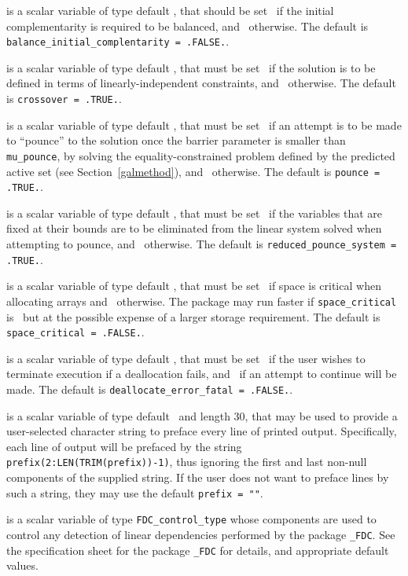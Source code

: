 \begin{description}
 is a scalar variable of type 
default \logical, that should be set \true\
if the initial complementarity is required to be balanced,
and \false\ otherwise.
The default is {\tt balance\_initial\_complentarity = .FALSE.}.

 is a scalar variable of type default \logical,
that must be set \true\ if the solution is to be defined in terms
of linearly-independent constraints,
and  \false\ otherwise.
The default is {\tt crossover = .TRUE.}.

 is a scalar variable of type default \logical,
that must be set \true\ if an attempt is to be made to ``pounce'' to the
solution once the barrier parameter is smaller than {\tt mu\_pounce},
by solving the equality-constrained problem defined by the predicted
active set (see Section~\ref{galmethod}), and \false\ otherwise.
The default is {\tt pounce = .TRUE.}.

 is a scalar variable of type default \logical,
that must be set \true\ if the variables that are fixed at their bounds
are to be eliminated from the linear system solved when attempting to
pounce, and \false\ otherwise.
The default is {\tt reduced\_pounce\_system = .TRUE.}.

 is a scalar variable of type default \logical,
that must be set \true\ if space is critical when allocating arrays
and  \false\ otherwise. The package may run faster if
{\tt space\_critical} is \false\ but at the possible expense of a larger
storage requirement. The default is {\tt space\_critical = .FALSE.}.

 is a scalar variable of type default \logical,
that must be set \true\ if the user wishes to terminate execution if
a deallocation  fails, and \false\ if an attempt to continue
will be made. The default is {\tt deallocate\_error\_fatal = .FALSE.}.

 is a scalar variable of type default \character\
and length 30, that may be used to provide a user-selected
character string to preface every line of printed output.
Specifically, each line of output will be prefaced by the string
{\tt prefix(2:LEN(TRIM(prefix))-1)},
thus ignoring the first and last non-null components of the
supplied string. If the user does not want to preface lines by such
a string, they may use the default {\tt prefix = ""}.

 is a scalar variable of type
{\tt FDC\_control\_type}
whose components are used to control any detection of linear dependencies
performed by the package
{\tt \libraryname\_FDC}.
See the specification sheet for the package
{\tt \libraryname\_FDC}
for details, and appropriate default values.


\end{description}
